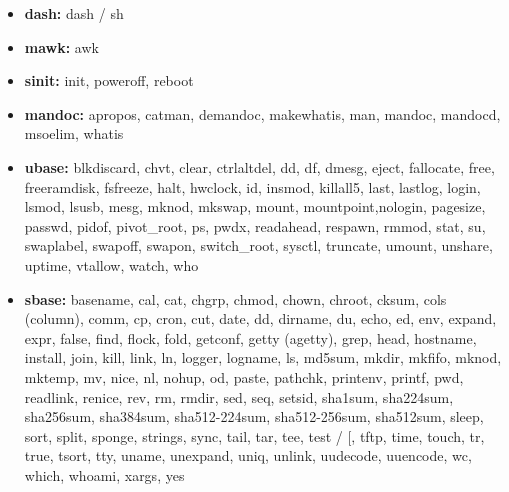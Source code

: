 \begin{itemize}
    \item \textbf{dash:} dash / sh 
    \item \textbf{mawk:} awk
    \item \textbf{sinit:} init, poweroff, reboot
    \item \textbf{mandoc:} apropos, catman, demandoc, makewhatis, man, mandoc, mandocd, msoelim, whatis
    \item \textbf{ubase:} blkdiscard, chvt, clear, ctrlaltdel, dd, df, dmesg, eject, fallocate, free, freeramdisk, fsfreeze, halt, hwclock, id, insmod, killall5, last, lastlog, login, lsmod, lsusb, mesg, mknod, mkswap, mount, mountpoint,nologin, pagesize, passwd, pidof, pivot\_root, ps, pwdx, readahead, respawn, rmmod, stat, su, swaplabel, swapoff, swapon, switch\_root, sysctl, truncate, umount, unshare, uptime, vtallow, watch, who
    \item \textbf{sbase:} basename, cal, cat, chgrp, chmod, chown, chroot, cksum, cols (column), comm, cp, cron, cut, date, dd, dirname, du, echo, ed, env, expand, expr, false, find, flock, fold, getconf, getty (agetty), grep, head, hostname, install, join, kill, link, ln, logger, logname, ls, md5sum, mkdir, mkfifo, mknod, mktemp, mv, nice, nl, nohup, od, paste, pathchk, printenv, printf, pwd, readlink, renice, rev, rm, rmdir, sed, seq, setsid, sha1sum, sha224sum, sha256sum, sha384sum, sha512-224sum, sha512-256sum, sha512sum, sleep, sort, split, sponge, strings, sync, tail, tar, tee, test / [, tftp, time, touch, tr, true, tsort, tty, uname, unexpand, uniq, unlink, uudecode, uuencode, wc, which, whoami, xargs, yes
\end{itemize}
